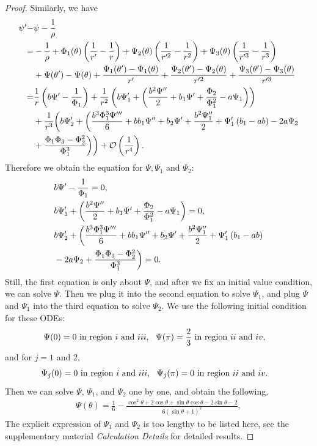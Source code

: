 \documentclass{article}
\def \Rone{\uppercase\expandafter{\romannumeral1}}
\def \Rtwo{\uppercase\expandafter{\romannumeral2}}
\def \Rthree{\uppercase\expandafter{\romannumeral3}}
\def \Rfour{\uppercase\expandafter{\romannumeral4}}
\numberwithin{figure}{section}
\numberwithin{equation}{section}
\theoremstyle{remark}
\theoremstyle{definition}
\begin{document}
{\begin{proof}
    Similarly, we have 
    \begin{align}\label{expanding2}
        \psi'-&\psi-\frac{1}{\rho}\notag\\
        =&-\frac{1}{\rho}+\Phi_{1}(\theta)\left(\frac{1}{r'}-\frac{1}{r}\right) + \Psi_{2}(\theta)\left(\frac{1}{r'^2}-\frac{1}{r^2}\right)+\Psi_{3}(\theta)\left(\frac{1}{r'^3}-\frac{1}{r^3}\right)\notag \\
        &+ \Psi(\theta')-\Psi(\theta) + \frac{\Psi_{1}(\theta')-\Psi_1(\theta)}{r'} + \frac{\Psi_{2}(\theta')-\Psi_2(\theta)}{r'^2} + \frac{\Psi_{3}(\theta')-\Psi_3(\theta)}{r'^{3}}\notag \\
        =&\frac{1}{r}\left(b\Psi'-\frac{1}{\Phi_1}\right)+\frac{1}{r^2}\left(b\Psi_1'+\left(\frac{b^2\Psi''}{2}+b_1\Psi'+\frac{\Phi_2}{\Phi_1^2}-a\Psi_1\right)\right) \notag \\
        &+\frac{1}{r^3}\biggl(b\Psi_2'+\biggl(\frac{b^3\Phi_1^3\Psi'''}{6}+bb_1\Psi''+b_2\Psi'+\frac{b^2\Psi_1''}{2}+\Psi_1'\left(b_1-ab\right)-2a\Psi_2\notag \\
        &+\frac{\Phi_1\Phi_3-\Phi_2^2}{\Phi_1^3}\biggr)\biggr)+\mathcal{O}\left(\frac{1}{r^4}\right).
    \end{align}
    Therefore we obtain the equation for $\Psi,\Psi_1$ and $\Psi_2$:
    \begin{align}\label{equations about psi}
       & b\Psi'-\frac{1}{\Phi_1}=0, \notag \\
       &b\Psi_1'+\left(\frac{b^2\Psi''}{2}+b_1\Psi'+\frac{\Phi_2}{\Phi_1^2}-a\Psi_1\right)=0, \notag \\
       &b\Psi_2'+\biggl(\frac{b^3\Phi_1^3\Psi'''}{6}+bb_1\Psi''+b_2\Psi'+\frac{b^2\Psi_1''}{2}+\Psi_1'\left(b_1-ab\right) \notag\\
       &-2a\Psi_2+\frac{\Phi_1\Phi_3-\Phi_2^2}{\Phi_1^3}\biggr)=0. 
    \end{align}
    Still, the first equation is only about $\Psi$, and after we fix an initial value condition, we can solve $\Psi$. Then we plug it into the second equation to solve $\Psi_1$, and plug $\Psi$ and $\Psi_1$ into the third equation to solve $\Psi_2$.
    We use the following initial condition for these ODEs:
    \begin{align}\label{special initial cond}
        &\Psi(0)=0\ {\rm in\ region\ } \Rone\ {\rm and\ } \Rthree, \ \ \Psi(\pi)=\frac{2}{3}\ {\rm in\ region\ } \Rtwo\ {\rm and\ } \Rfour, 
    \end{align}
     and for $j=1$ and $2$,
    \begin{align}
        &\Psi_j(0)=0\ {\rm in\ region\ } \Rone\ {\rm and\ } \Rthree, \ \ \Psi_j(\pi)=0\ {\rm in\ region\ } \Rtwo\ {\rm and\ } \Rfour. 
    \end{align}
    Then we can solve $\Psi$, $\Psi_1$, and $\Psi_2$ one by one, and obtain the following.
    \begin{align}
        \Psi(\theta)=\frac{1}{6}-\frac{\cos^2\theta+2\cos\theta+\sin\theta\cos\theta-2\sin\theta-2}{6\left(\sin\theta+1\right)^2},
    \end{align}
    The explicit expression of $\Psi_1$ and $\Psi_2$ is too lengthy to be listed here, see the supplementary material \emph{Calculation Details} for detailed results.
    

\end{proof}}
\end{document}
